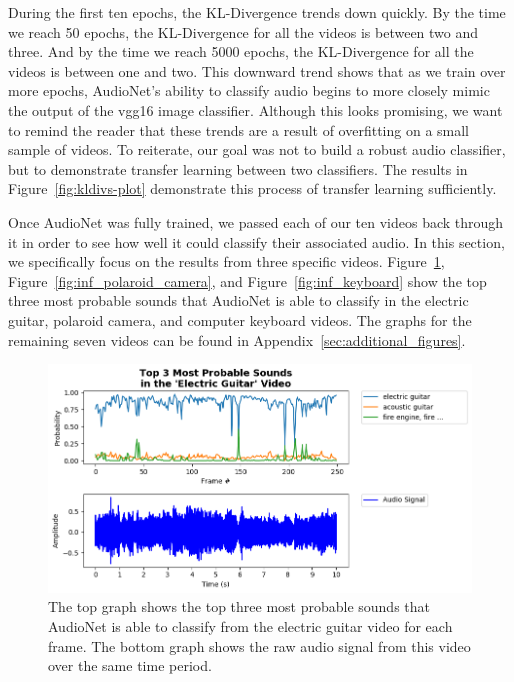 \documentclass[12pt,twoside]{article}
\theoremstyle{plain}
\theoremstyle{definition}
\theoremstyle{remark}
\begin{document}
During the first ten epochs, the KL-Divergence trends down quickly.
By the time we reach 50 epochs, the KL-Divergence for all the videos is between two and three.
And by the time we reach 5000 epochs, the KL-Divergence for all the videos is between one and two.
This downward trend shows that as we train over more epochs, AudioNet’s ability to classify audio begins to more closely mimic the output of the vgg16 image classifier.
Although this looks promising, we want to remind the reader that these trends are a result of overfitting on a small sample of videos.
To reiterate, our goal was not to build a robust audio classifier, but to demonstrate transfer learning between two classifiers.
The results in Figure~\ref{fig:kldivs-plot} demonstrate this process of transfer learning sufficiently.

Once AudioNet was fully trained, we passed each of our ten videos back through it in order to see how well it could classify their associated audio.
In this section, we specifically focus on the results from three specific videos.
Figure~\ref{fig:inf_electric_guitar}, Figure~\ref{fig:inf_polaroid_camera}, and Figure~\ref{fig:inf_keyboard} show the top three most probable sounds that AudioNet is able to classify in the electric guitar, polaroid camera, and computer keyboard videos.
The graphs for the remaining seven videos can be found in Appendix~\ref{sec:additional_figures}.

\begin{figure}[H]
   \centerline{\includegraphics[width=\textwidth]{inf_electric_guitar.png}}
   {\caption{\footnotesize The top graph shows the top three most probable sounds that AudioNet is able to classify from the electric guitar video for each frame.
             The bottom graph shows the raw audio signal from this video over the same time period.}
     \label{fig:inf_electric_guitar}}
\end{figure}
\end{document}
